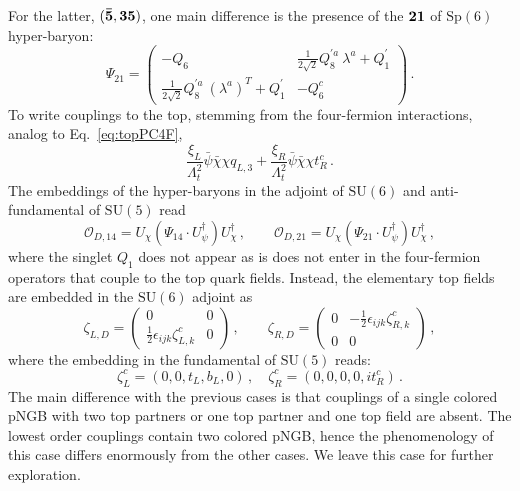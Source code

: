 \documentclass[preprintnumbers,nofootinbib,showpacs,eqsecnum,pre,12pt]{revtex4-1}
\newcommand{\SU}{\text{SU}}
\newcommand{\Sp}{\text{Sp}}
\begin{document}
For the latter, $({\bf \bar 5}, {\bf 35})$, one main difference is the presence of the $\bf 21$ of $\Sp(6)$ hyper-baryon:
\begin{equation} 
\Psi_{21} =  \begin{pmatrix}  -Q_6 &  \frac{1}{2\sqrt{2}} Q_8^{\prime a}\ \lambda^a  + Q_1^\prime \\  \frac{1}{2\sqrt{2}} Q^{\prime a}_8\ (\lambda^a)^T + Q_1^\prime & -Q_6^c  \end{pmatrix}\,.
\end{equation}
To write couplings to the top, stemming from the four-fermion interactions, analog to Eq.~\eqref{eq:topPC4F},
\begin{equation}
    \frac{\xi_L}{\Lambda_t^2} \bar{\psi} \bar{\chi} \chi q_{L,3} + \frac{\xi_R}{\Lambda_t^2} \bar{\psi} \bar{\chi} \chi t_{R}^c \,.
\end{equation}
The embeddings of the hyper-baryons in the adjoint of $\SU(6)$ and anti-fundamental of $\SU(5)$ read
\begin{equation}
    \mathcal O_{D,14} = U_\chi (\Psi_{14} \cdot U_\psi^\dagger) U_\chi^\dagger\,, \qquad 
    \mathcal O_{D,21}= U_\chi (\Psi_{21} \cdot U_\psi^\dagger) U_\chi^\dagger\,,
\end{equation}
where the singlet $Q_1$ does not appear as is does not enter in the four-fermion operators that couple to the top quark fields.
Instead, the elementary top fields are embedded in the $\SU(6)$ adjoint as
\begin{equation}
    \zeta_{L,D}   =  \begin{pmatrix}  0 & 0 \\ \frac 12 \epsilon_{ijk} \zeta_{L,k}^c  & 0 \end{pmatrix}\,, \qquad \zeta_{R,D}   =  \begin{pmatrix}  0 & -\frac 12 \epsilon_{ijk} \zeta^c_{R,k}  \\ 0 & 0 \end{pmatrix}\,,
\end{equation}
where the embedding in the fundamental of $\SU(5)$ reads:
\begin{equation}
    \zeta_L^c = (0, 0, t_L, b_L, 0)\,, \quad \zeta_R^c = (0,0,0,0,i t_R^c)\,.
\end{equation}
The main difference with the previous cases is that couplings of a single colored pNGB with two top partners or one top partner and one top field are absent. 
The lowest order couplings contain two colored pNGB, hence the phenomenology of this case differs enormously from the other cases. We leave this case for further exploration.
\end{document}
